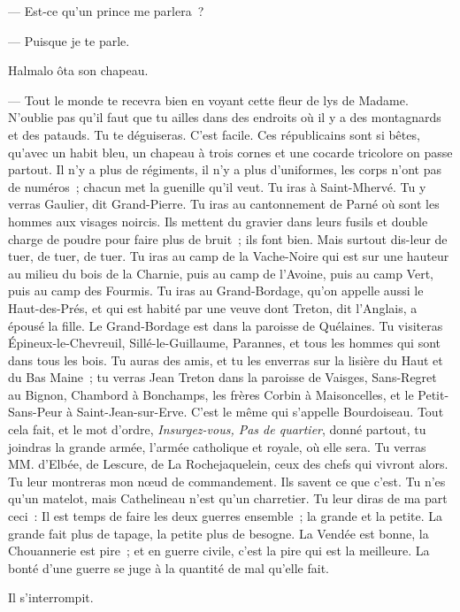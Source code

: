 \documentclass[french,twoside]{book} %
\begin{document}
— Est-ce qu’un prince me parlera ?\par
— Puisque je te parle.\par
Halmalo ôta son chapeau.\par
— Tout le monde te recevra bien en voyant cette fleur de lys de Madame. N’oublie pas qu’il faut que tu ailles dans des endroits où il y a des montagnards et des patauds. Tu te déguiseras. C’est facile. Ces républicains sont si bêtes, qu’avec un habit bleu, un chapeau à trois cornes et une cocarde tricolore on passe partout. Il n’y a plus de régiments, il n’y a plus d’uniformes, les corps n’ont pas de numéros ; chacun met la guenille qu’il veut. Tu iras à Saint-Mhervé. Tu y verras Gaulier, dit Grand-Pierre. Tu iras au cantonnement de Parné où sont les hommes aux visages noircis. Ils mettent du gravier dans leurs fusils et double charge de poudre pour faire plus de bruit ; ils font bien. Mais surtout dis-leur de tuer, de tuer, de tuer. Tu iras au camp de la Vache-Noire qui est sur une hauteur au milieu du bois de la Charnie, puis au camp de l’Avoine, puis au camp Vert, puis au camp des Fourmis. Tu iras au Grand-Bordage, qu’on appelle aussi le Haut-des-Prés, et qui est habité par une veuve  dont Treton, dit l’Anglais, a épousé la fille. Le Grand-Bordage est dans la paroisse de Quélaines. Tu visiteras Épineux-le-Chevreuil, Sillé-le-Guillaume, Parannes, et tous les hommes qui sont dans tous les bois. Tu auras des amis, et tu les enverras sur la lisière du Haut et du Bas Maine ; tu verras Jean Treton dans la paroisse de Vaisges, Sans-Regret au Bignon, Chambord à Bonchamps, les frères Corbin à Maisoncelles, et le Petit-Sans-Peur à Saint-Jean-sur-Erve. C’est le même qui s’appelle Bourdoiseau. Tout cela fait, et le mot d’ordre, \emph{Insurgez-vous, Pas de quartier}, donné partout, tu joindras la grande armée, l’armée catholique et royale, où elle sera. Tu verras MM. d’Elbée, de Lescure, de La Rochejaquelein, ceux des chefs qui vivront alors. Tu leur montreras mon nœud de commandement. Ils savent ce que c’est. Tu n’es qu’un matelot, mais Cathelineau n’est qu’un charretier. Tu leur diras de ma part ceci : Il est temps de faire les deux guerres ensemble ; la grande et la petite. La grande fait plus de tapage, la petite plus de besogne. La Vendée est bonne, la Chouannerie est pire ; et en guerre civile, c’est la pire qui est la meilleure. La bonté d’une guerre se juge à la quantité de mal qu’elle fait.\par
Il s’interrompit.\par
\end{document}
